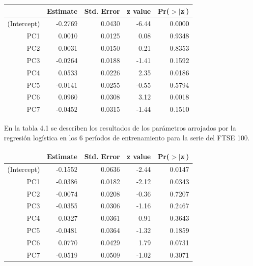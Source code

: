 \documentclass[a4paper,12pt]{Latex/Classes/PhDthesisPSnPDF}
\begin{document}
\begin{center}
\begin{table}[ht]
\centering
\begin{tabular}{rrrrr}
  \hline
 & Estimate & Std. Error & z value & Pr($>$$|$z$|$) \\ 
  \hline
(Intercept) & -0.2769 & 0.0430 & -6.44 & 0.0000 \\ 
  PC1 & 0.0010 & 0.0125 & 0.08 & 0.9348 \\ 
  PC2 & 0.0031 & 0.0150 & 0.21 & 0.8353 \\ 
  PC3 & -0.0264 & 0.0188 & -1.41 & 0.1592 \\ 
  PC4 & 0.0533 & 0.0226 & 2.35 & 0.0186 \\ 
  PC5 & -0.0141 & 0.0255 & -0.55 & 0.5794 \\ 
  PC6 & 0.0960 & 0.0308 & 3.12 & 0.0018 \\ 
  PC7 & -0.0452 & 0.0315 & -1.44 & 0.1510 \\ 
   \hline
\end{tabular}
\end{table}\end{center}



En la tabla 4.1 se describen los resultados de los parámetros arrojados por la regresión logística en los 6 períodos de entrenamiento para la serie del FTSE 100.
\begin{center}
\begin{table}[ht]
\centering
\begin{tabular}{rrrrr}
  \hline
 & Estimate & Std. Error & z value & Pr($>$$|$z$|$) \\ 
  \hline
(Intercept) & -0.1552 & 0.0636 & -2.44 & 0.0147 \\ 
  PC1 & -0.0386 & 0.0182 & -2.12 & 0.0343 \\ 
  PC2 & -0.0074 & 0.0208 & -0.36 & 0.7207 \\ 
  PC3 & -0.0355 & 0.0306 & -1.16 & 0.2467 \\ 
  PC4 & 0.0327 & 0.0361 & 0.91 & 0.3643 \\ 
  PC5 & -0.0481 & 0.0364 & -1.32 & 0.1859 \\ 
  PC6 & 0.0770 & 0.0429 & 1.79 & 0.0731 \\ 
  PC7 & -0.0519 & 0.0509 & -1.02 & 0.3071 \\ 
   \hline
\end{tabular}
\end{table}\end{center}
\end{document}
